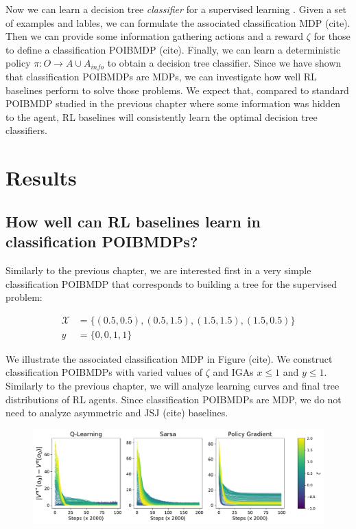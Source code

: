 Now we can learn a decision tree \textit{classifier} for a supervised learning . 
Given a set of examples and lables, we can formulate the associated classification MDP (cite). 
Then we can provide some information gathering actions and a reward $\zeta$ for those to define a classification POIBMDP (cite).
Finally, we can learn a deterministic policy $\pi : O \rightarrow A\cup A_{info}$ to obtain a decision tree classifier. 
Since we have shown that classification POIBMDPs are MDPs, we can investigate how well RL baselines perform to solve those problems. 
We expect that, compared to standard POIBMDP studied in the previous chapter where some information was hidden to the agent, RL baselines will consistently learn the optimal decision tree classifiers.

\section{Results}

\subsection{How well can RL baselines learn in classification POIBMDPs?}
Similarly to the previous chapter, we are interested first in a very simple classification POIBMDP that corresponds to building a tree for the supervised problem:

\begin{align*}
    \mathcal{X} &= \{(0.5, 0.5), (0.5, 1.5), (1.5, 1.5), (1.5, 0.5)\}\\
    y &= \{0, 0, 1, 1\} 
\end{align*}

We illustrate the associated classification MDP in Figure (cite). 
We construct classification POIBMDPs with varied values of $\zeta$ and IGAs $x\leq 1$ and $y\leq 1$.
Similarly to the previous chapter, we will analyze learning curves and final tree distributions of RL agents.
Since classification POIBMDPs are MDP, we do not need to analyze asymmetric and JSJ (cite) baselines.

\begin{figure}
    \centering
    \includegraphics[width=1\textwidth]{images/images_part1/learning_curves_classif.pdf}
    \caption{}\label{fig:rl-classif-poibmdp}
\end{figure}

